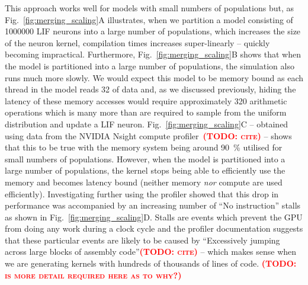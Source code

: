 \documentclass[9pt,twocolumn,twoside,lineno]{pnas-new}
\newcommand{\todo}[1]{\textbf{\textsc{\textcolor{red}{(TODO: #1)}}}}
\begin{document}
This approach works well for models with small numbers of populations but, as Fig.~\ref{fig:merging_scaling}A illustrates, when we partition a model consisting of \num{1000000} LIF neurons into a large number of populations, which increases the size of the neuron kernel, compilation times increases super-linearly -- quickly becoming impractical.
Furthermore, Fig.~\ref{fig:merging_scaling}B shows that when the model is partitioned into a large number of populations, the simulation also runs much more slowly.
We would expect this model to be memory bound as each thread in the model reads \SI{32}{\byte} of data and, as we discussed previously, hiding the latency of these memory accesses would require approximately 320 arithmetic operations which is many more than are required to sample from the uniform distribution and update a LIF neuron.
Fig.~\ref{fig:merging_scaling}C -- obtained using data from the NVIDIA Nsight compute profiler~\todo{cite} -- shows that this to be true with the memory system being around \SI{90}{\percent} utilised for small numbers of populations.
However, when the model is partitioned into a large number of populations, the kernel stops being able to efficiently use the memory and becomes latency bound (neither memory \emph{nor} compute are used efficiently).
Investigating further using the profiler showed that this drop in performance was accompanied by an increasing number of ``No instruction'' stalls as shown in Fig.~\ref{fig:merging_scaling}D.
Stalls are events which prevent the GPU from doing any work during a clock cycle and the profiler documentation suggests that these particular events are likely to be caused by ``Excessively jumping across large blocks of assembly code''\todo{cite} -- which makes sense when we are generating kernels with hundreds of thousands of lines of code.
\todo{is more detail required here as to why?}
\end{document}

